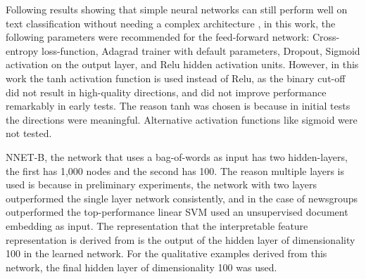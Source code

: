 Following results showing that simple neural networks can still perform well on text classification without needing a complex architecture  \cite{Lakhotia2018} \cite{Nam2014}, in this work, the following parameters were recommended for the feed-forward network: Cross-entropy loss-function, Adagrad trainer with default parameters, Dropout, Sigmoid activation on the output layer, and Relu hidden activation units. However, in this work the tanh activation function is used instead of Relu, as the binary cut-off  did not result in high-quality directions, and did not improve performance remarkably in early tests. The reason tanh was chosen is because in initial tests the directions were meaningful. Alternative activation functions  like sigmoid were not tested. %



NNET-B, the network that uses a   bag-of-words as input has  two hidden-layers, the first has  1,000 nodes and the second has 100. The reason multiple layers is used is because in preliminary experiments, the network with two layers outperformed the single layer network consistently, and in the case of newsgroups outperformed the top-performance linear SVM  used an unsupervised document embedding as input. The representation that the interpretable feature representation is derived from is the output of the hidden layer of dimensionality 100 in the learned network. For the qualitative examples derived from this network,  the final hidden layer of dimensionality 100 was used.

